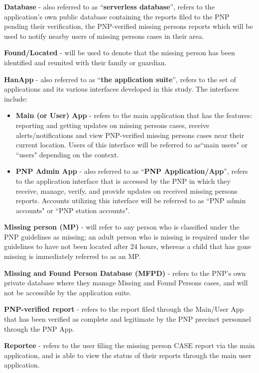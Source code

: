 \textbf{Database} - also referred to as “\textbf{serverless database}”, refers to the application’s own public database containing the reports filed to the PNP pending their verification, the PNP-verified missing persons reports which will be used to notify nearby users of missing persons cases in their area.

\textbf{Found/Located} - will be used to denote that the missing person has been identified and reunited with their family or guardian.

\textbf{HanApp} -  also referred to as “\textbf{the application suite}”, refers to the set of applications and its various interfaces developed in this study. The interfaces include:
\newpage
\begin{itemize}
    \item \textbf{Main (or User) App} - refers to the main application that has the features: reporting and getting updates on missing persons cases, receive alerts/notifications and view PNP-verified missing persons cases near their current location. Users of this interface will be referred to as``main users" or ``users" depending on the context.
    \item \textbf{PNP Admin App} - also referred to as ``\textbf{PNP Application/App}”, refers to the application interface that is accessed by the PNP in which they receive, manage, verify, and provide updates on received missing persons reports. Accounts utilizing this interface will be referred to as ``PNP admin accounts" or ``PNP station accounts". 
\end{itemize}

\textbf{Missing person (MP)} - will refer to any person who is classified under the PNP guidelines as missing; an adult person who is missing is required under the guidelines to have not been located after 24 hours, whereas a child that has gone missing is immediately referred to as an MP.

\textbf{Missing and Found Person Database (MFPD)} - refers to the PNP’s own private database where they manage Missing and Found Persons cases, and will not be accessible by the application suite.

\textbf{PNP-verified report} - refers to the report filed through the Main/User App that has been verified as complete and legitimate by the PNP precinct personnel through the PNP App.

\textbf{Reportee} - refers to the user filing the missing person CASE report via the main application, and is able to view the status of their reports through the main user application.

